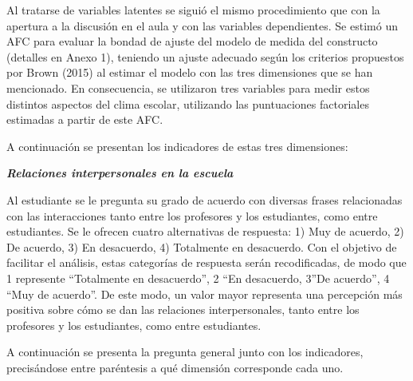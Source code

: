 \documentclass[12pt,twoside]{templates/facsothesis}
\begin{document}
Al tratarse de variables latentes se siguió el mismo procedimiento que con la apertura a la discusión en el aula y con las variables dependientes. Se estimó un AFC para evaluar la bondad de ajuste del modelo de medida del constructo (detalles en Anexo 1), teniendo un ajuste adecuado según los criterios propuestos por Brown (2015) al estimar el modelo con las tres dimensiones que se han mencionado. En consecuencia, se utilizaron tres variables para medir estos distintos aspectos del clima escolar, utilizando las puntuaciones factoriales estimadas a partir de este AFC.

A continuación se presentan los indicadores de estas tres dimensiones:

\textbf{\emph{Relaciones interpersonales en la escuela}}

Al estudiante se le pregunta su grado de acuerdo con diversas frases relacionadas con las interacciones tanto entre los profesores y los estudiantes, como entre estudiantes. Se le ofrecen cuatro alternativas de respuesta: 1) Muy de acuerdo, 2) De acuerdo, 3) En desacuerdo, 4) Totalmente en desacuerdo. Con el objetivo de facilitar el análisis, estas categorías de respuesta serán recodificadas, de modo que 1 represente ``Totalmente en desacuerdo'', 2 ``En desacuerdo, 3''De acuerdo'', 4 ``Muy de acuerdo''. De este modo, un valor mayor representa una percepción más positiva sobre cómo se dan las relaciones interpersonales, tanto entre los profesores y los estudiantes, como entre estudiantes.

A continuación se presenta la pregunta general junto con los indicadores, precisándose entre paréntesis a qué dimensión corresponde cada uno.
\end{document}

